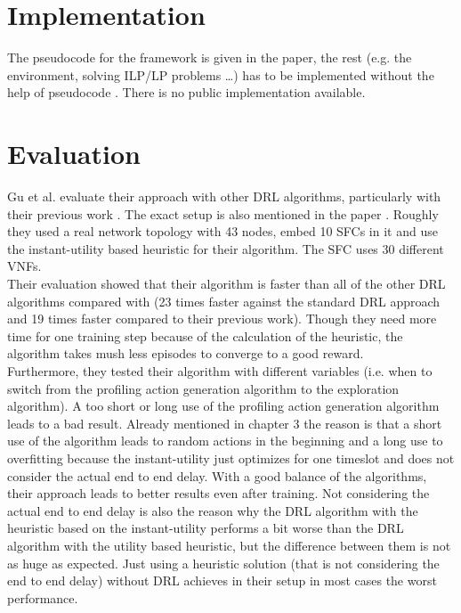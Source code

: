\section {Implementation}
The pseudocode for the framework is given in the paper, the rest (e.g. the environment, solving ILP/LP problems \dots) has to be implemented without the help of pseudocode \cite{Gu}. There is no public implementation available.


\section{Evaluation}%
\label{sec:evaluation}
Gu et al. \cite{Gu} evaluate their approach with other DRL algorithms, particularly with their previous work \cite{Guz}. The exact setup is also mentioned in the paper \cite{Gu}. Roughly they used a real network topology with 43 nodes, embed 10 SFCs in it and use the instant-utility based heuristic for their algorithm. The SFC uses 30 different VNFs.\\
Their evaluation showed that their algorithm is faster than all of the other DRL algorithms compared with (23 times faster against the standard DRL approach and 19 times faster compared to their previous work). Though they need more time for one training step because of the calculation of the heuristic, the algorithm takes mush less episodes to converge to a good reward.\\
Furthermore, they tested their algorithm with different variables (i.e. when to switch from the profiling action generation algorithm to the exploration algorithm). A too short or long use of the profiling action generation algorithm leads to a bad result. Already mentioned in chapter 3 %
the reason is that a short use of the algorithm leads to random actions in the beginning and a long use to overfitting because the instant-utility just optimizes for one timeslot and does not consider the actual end to end delay. With a good balance of the algorithms, their approach leads to better results even after training. Not considering the actual end to end delay is also the reason why the DRL algorithm with the heuristic based on the instant-utility performs a bit worse than the DRL algorithm with the utility based heuristic, but the difference between them is not as huge as expected. Just using a heuristic solution (that is not considering the end to end delay) without DRL achieves in their setup in most cases the worst performance.




